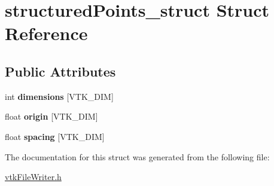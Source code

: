 \hypertarget{structstructuredPoints__struct}{
\section{structuredPoints\_\-struct Struct Reference}
\label{structstructuredPoints__struct}
}
\subsection*{Public Attributes}
\begin{DoxyCompactItemize}
\item 
\hypertarget{structstructuredPoints__struct_a3b462fb47fafb3e56f6e3c79699a239e}{
int {\bfseries dimensions} \mbox{[}VTK\_\-DIM\mbox{]}}
\label{structstructuredPoints__struct_a3b462fb47fafb3e56f6e3c79699a239e}

\item 
\hypertarget{structstructuredPoints__struct_abbb9f17ee1e77e06e86471efb5ec132d}{
float {\bfseries origin} \mbox{[}VTK\_\-DIM\mbox{]}}
\label{structstructuredPoints__struct_abbb9f17ee1e77e06e86471efb5ec132d}

\item 
\hypertarget{structstructuredPoints__struct_a6c93f3f717f691877b74872cff7c5ed3}{
float {\bfseries spacing} \mbox{[}VTK\_\-DIM\mbox{]}}
\label{structstructuredPoints__struct_a6c93f3f717f691877b74872cff7c5ed3}

\end{DoxyCompactItemize}


The documentation for this struct was generated from the following file:\begin{DoxyCompactItemize}
\item 
\hyperlink{vtkFileWriter_8h}{vtkFileWriter.h}\end{DoxyCompactItemize}

